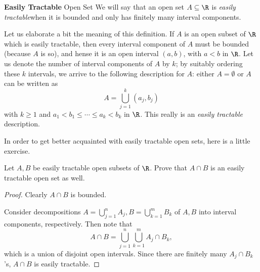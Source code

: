 \documentclass[pmath450]{subfiles}
\begin{document}
    \begin{definition}{\textbf{Easily Tractable} Open Set}
        We will say that an open set $A\subseteq\R$ is \emph{easily tractable}\footnotemark[1] when it is bounded and only has finitely many interval components.
        
        \noindent
        \begin{minipage}{\textwidth}
        \end{minipage}
    \end{definition}

    \np Let us elaborate a bit the meaning of this definition. If $A$ is an open subset of $\R$ which is easily tractable, then every interval component of $A$ must be bounded (because $A$ is so), and hense it is an open interval $\left( a,b \right)$, with $a<b$ in $\R$. Let us denote the number of interval components of $A$ by $k$; by suitably ordering these $k$ intervals, we arrive to the following description for $A$: either $A=\emptyset$ or $A$ can be written as
    \begin{equation*}
        A = \bigcup^{k}_{j=1}\left( a_j,b_j \right)
    \end{equation*}
    with $k\geq 1$ and $a_1<b_1\leq\cdots\leq a_k<b_k$ in $\R$. This really is an \textit{easily tractable} description.

    In order to get better acquainted with easily tractable open sets, here is a little exercise.

    \begin{exercise}{}
        Let $A,B$ be easily tractable open subsets of $\R$. Prove that $A\cap B$ is an easily tractable open set as well.
    \end{exercise}

    \begin{proof}
        Clearly $A\cap B$ is bounded.

        Consider decompositions $A=\bigcup^{n}_{j=1} A_j, B=\bigcup^{m}_{k=1} B_k$ of $A,B$ into interval components, respectively. Then note that
        \begin{equation*}
            A\cap B= \bigcup^{n}_{j=1}\bigcup^{m}_{k=1} A_j\cap B_k,
        \end{equation*}
        which is a union of disjoint open intervals. Since there are finitely many $A_j\cap B_k$'s, $A\cap B$ is easily tractable.
    \end{proof}
\end{document}

